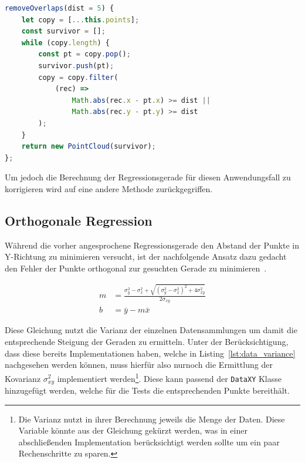\begin{lstlisting}[language=JavaScript, caption={Definition der \lstinline{removeOverlaps} Funktion der \lstinline{PointCloud} Klasse.}, label={lst:pointcloud_removeOverlaps}]
removeOverlaps(dist = 5) {
    let copy = [...this.points];
    const survivor = [];
    while (copy.length) {
        const pt = copy.pop();
        survivor.push(pt);
        copy = copy.filter(
            (rec) =>
                Math.abs(rec.x - pt.x) >= dist ||
                Math.abs(rec.y - pt.y) >= dist
        );
    }
    return new PointCloud(survivor);
};
\end{lstlisting}

Um jedoch die Berechnung der Regressionsgerade für diesen Anwendungsfall zu korrigieren wird auf eine andere Methode zurückgegriffen.

\subsection{Orthogonale Regression}\label{ch:orthogonale_regression}

Während die vorher angesprochene Regressionsgerade den Abstand der Punkte in Y-Richtung zu minimieren versucht, ist der nachfolgende Ansatz dazu gedacht den Fehler der Punkte orthogonal zur gesuchten Gerade zu minimieren~\cite{JuergenHedderich2020}.%

\begin{equation}
    \begin{split}
        m &= \frac{\sigma_y^2 - \sigma_x^2 + \sqrt{(\sigma_y^2 - \sigma_x^2)^2 + 4\sigma_{xy}^2}}{2\sigma_{xy}} \\
        b &= \bar{y} - m \bar{x}
    \end{split}
    \label{eq:orthogonal_regression}
\end{equation}

Diese Gleichung nutzt die Varianz der einzelnen Datensammlungen um damit die entsprechende Steigung der Geraden zu ermitteln.
Unter der Berücksichtigung, dass diese bereits Implementationen haben, welche in Listing~\ref{lst:data_variance} nachgesehen werden können, muss hierfür also nurnoch die Ermittlung der Kovarianz $\sigma_{xy}^2$ implementiert werden\footnote{Die Varianz nutzt in ihrer Berechnung jeweils die Menge der Daten. Diese Variable könnte aus der Gleichung gekürzt werden, was in einer abschlie{\ss}enden Implementation berücksichtigt werden sollte um ein paar Rechenschritte zu sparen.}.
Diese kann passend der \lstinline{DataXY} Klasse hinzugefügt werden, welche für die Tests die entsprechenden Punkte bereithält.

